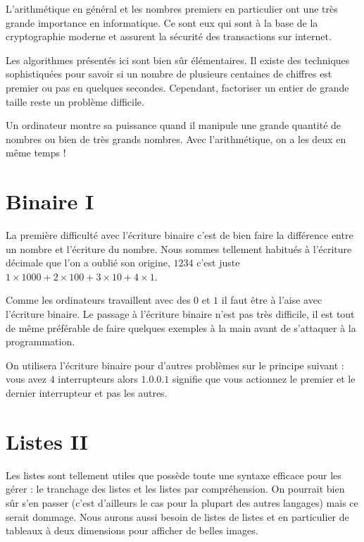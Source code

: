 \documentclass[11pt,class=report,crop=false]{standalone}
\begin{document}
L'arithmétique en général et les nombres premiers en particulier ont une très grande importance en informatique. Ce sont eux qui sont à la base de la cryptographie moderne et assurent la sécurité des transactions sur internet.

Les algorithmes présentés ici sont bien sûr élémentaires. Il existe des techniques sophistiquées pour savoir si un nombre de plusieurs centaines de chiffres est premier ou pas en quelques secondes. Cependant, factoriser un entier de grande taille reste un problème difficile.

Un ordinateur montre sa puissance quand il manipule une grande quantité de nombres ou bien de très grands nombres. Avec l'arithmétique, on a les deux en même temps !


\section{Binaire I}

La première difficulté avec l'écriture binaire c'est de bien faire la différence entre un nombre et l'écriture du nombre. Nous sommes tellement habitués à l'écriture décimale que l'on a oublié son origine, $1234$ c'est juste $1\times 1000 + 2 \times 100 + 3 \times 10 + 4\times 1$.

Comme les ordinateurs travaillent avec des $0$ et $1$ il faut être à l'aise avec l'écriture binaire. Le passage à l'écriture binaire n'est pas très difficile, il est tout de même préférable de faire quelques exemples à la main avant de s'attaquer à la programmation.

On utilisera l'écriture binaire pour d'autres problèmes sur le principe suivant : vous avez $4$ interrupteurs alors $1.0.0.1$ signifie que vous actionnez le premier et le dernier interrupteur et pas les autres.


\section{Listes II}

Les listes sont tellement utiles que \Python{} possède toute une syntaxe efficace pour les gérer : le tranchage des listes et les listes par compréhension. On pourrait bien sûr s'en passer (c'est d'ailleurs le cas pour la plupart des  autres langages) mais ce serait dommage.
Nous aurons aussi besoin de listes de listes et en particulier de tableaux à deux dimensions pour afficher de belles images.
\end{document}
